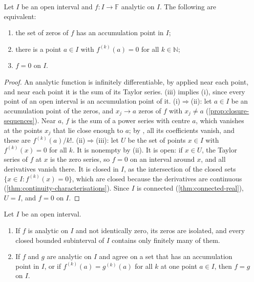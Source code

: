 \begin{theorem}
\label{thm:identity}
Let $I$ be an open interval and $f\colon I\to\mathbb F$ analytic on $I$. The following are equivalent:
\begin{enumerate}
\item the set of zeros of $f$ has an accumulation point in $I$;
\item there is a point $a\in I$ with $f^{(k)}(a)=0$ for all $k\in\mathbb N$;
\item $f=0$ on $I$.
\end{enumerate}
\end{theorem}

\begin{proof}
An analytic function is infinitely differentiable, by  applied near each point, and near each point it is the sum of its Taylor series. (iii) implies (i), since every point of an open interval is an accumulation point of it. (i)$\Rightarrow$(ii): let $a\in I$ be an accumulation point of the zeros, and $x_j\to a$ zeros of $f$ with $x_j\ne a$ (\cref{prop:closure-sequences}). Near $a$, $f$ is the sum of a power series with centre $a$, which vanishes at the points $x_j$ that lie close enough to $a$; by , all its coefficients vanish, and these are $f^{(k)}(a)/k!$. (ii)$\Rightarrow$(iii): let $U$ be the set of points $x\in I$ with $f^{(k)}(x)=0$ for all $k$. It is nonempty by (ii). It is open: if $x\in U$, the Taylor series of $f$ at $x$ is the zero series, so $f=0$ on an interval around $x$, and all derivatives vanish there. It is closed in $I$, as the intersection of the closed sets $\{x\in I: f^{(k)}(x)=0\}$, which are closed because the derivatives are continuous (\cref{thm:continuity-characterisations}). Since $I$ is connected (\cref{thm:connected-real}), $U=I$, and $f=0$ on $I$.
\end{proof}

\begin{corollary}
\label{cor:identity}
Let $I$ be an open interval.
\begin{enumerate}
\item If $f$ is analytic on $I$ and not identically zero, its zeros are isolated, and every closed bounded subinterval of $I$ contains only finitely many of them.
\item If $f$ and $g$ are analytic on $I$ and agree on a set that has an accumulation point in $I$, or if $f^{(k)}(a)=g^{(k)}(a)$ for all $k$ at one point $a\in I$, then $f=g$ on $I$.
\end{enumerate}
\end{corollary}


